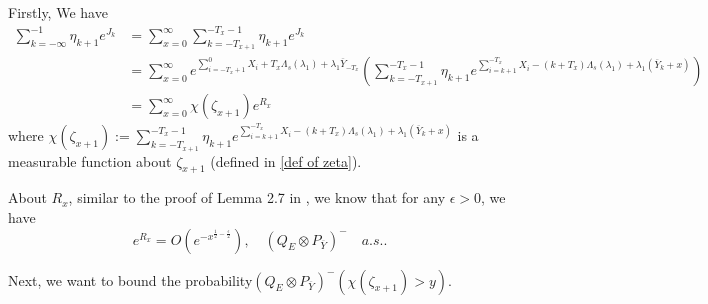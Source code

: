 \documentclass[]{article}
\makeatletter
\numberwithin{equation}{section}
\renewenvironment{proof}[1][\proofname]{%
	\par\pushQED{\qed}\normalfont%
	\topsep6\p@\@plus6\p@\relax
	\trivlist\item[\hskip\labelsep\bfseries#1\@addpunct{.}]%
	\ignorespaces
}{%
	\popQED\endtrivlist\@endpefalse
}
\theoremstyle{thmstyleone}%
\theoremstyle{thmstyletwo}%
\theoremstyle{thmstylethree}%
\theoremstyle{thmstylefour}%
\theoremstyle{thmstylefive}%
\theoremstyle{thmstylesix}%
\makeatother
\begin{document}
	\begin{proof}[Proof of \Cref{lemma1 for intermediately}]
		Firstly, We have
		\begin{align}
			\sum_{k=-\infty}^{-1} \eta_{k+1} e^{J_k}
			&=
			\sum_{x=0}^{\infty} 
			\sum_{k=-T_{x+1}}^{-T_x-1} \eta_{k+1} e^{J_k}
			\nonumber
			\\
			&=
			\sum_{x=0}^{\infty} e^{\sum\limits_{i=-T_x+1}^0 X_i +T_x\Lambda_s(\lambda_1)+\lambda_1 \overline{Y}_{-T_x}} 
			\left(\sum_{k=-T_{x+1}}^{-T_x-1} \eta_{k+1} e^{\sum\limits_{i=k+1}^{-T_x} X_i - (k+T_x)\Lambda_s(\lambda_1)+\lambda_1(\overline{Y}_{k}+x)} 
			\right)
			\nonumber\\
			&=\sum_{x=0}^{\infty}
			\chi(\zeta_{x+1})e^{R_x} \nonumber
		\end{align}
		where $\chi(\zeta_{x+1}):= \sum\limits_{k=-T_{x+1}}^{-T_x-1} \eta_{k+1} e^{\sum\limits_{i=k+1}^{-T_x} X_i - (k+T_x)\Lambda_s(\lambda_1)+\lambda_1(\overline{Y}_k+x)} $ is a measurable function about $\zeta_{x+1}$ (defined in \cref{def of zeta}).
		
		About $R_x$, similar to the proof of Lemma 2.7 in \cite{Afanasyev2005}, we know that for any $\epsilon>0$, we have
		\begin{equation}\label{Decay of R_x}
			e^{R_x} = O(e^{-x^{\frac{1}{2}-\frac{\epsilon}{2}}}), \quad (Q_E\otimes P_{\overline{Y}})^- \quad a.s..
		\end{equation}
		
		Next, we want to bound the probability$ \left(Q_E\otimes P_{\overline{Y}}\right)^- (\chi(\zeta_{x+1}) > y).$
		

\end{proof}
\end{document}
